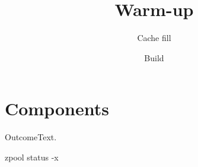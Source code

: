 \documentclass{jupiter-report}
\title{Warm-up}
\subtitle{Cache fill}
\author{Build}
\begin{document}
\maketitle
\tableofcontents
\section{Components}
\begin{jpcallout}[ok]{Outcome}Text.\end{jpcallout}
\begin{jpcode}
zpool status -x
\end{jpcode}
\end{document}
